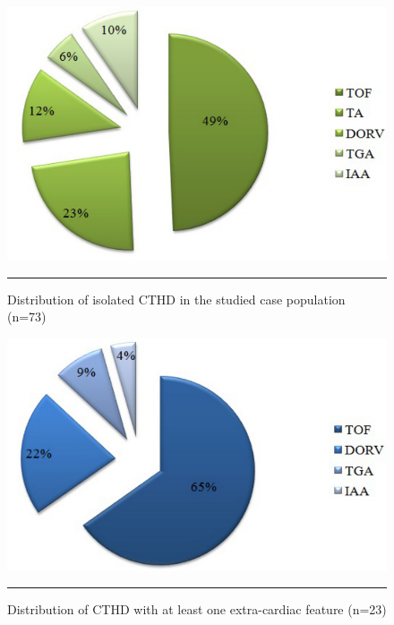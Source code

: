 \begin{refsection}
\begin{figure}[!thb]
\centering
\includegraphics[scale=0.65,keepaspectratio]{Figures/Figure4_2pie.pdf}
\rule{35em}{0.5pt}
\caption[Distribution of isolated CTHD in the studied case population]{Distribution of isolated CTHD in the studied case population (n=73)}
\label{fig:4_2}
\end{figure}

\begin{figure}[!thb]
\centering
\includegraphics[scale=0.65]{Figures/Figure4_3pie.pdf}
\rule{35em}{0.5pt}
\caption[Distribution of CTHD with at least one extra-cardiac feature (n=23)]{Distribution of CTHD with at least one extra-cardiac feature (n=23)}
\label{fig:4_3}
\end{figure}


\end{refsection}
